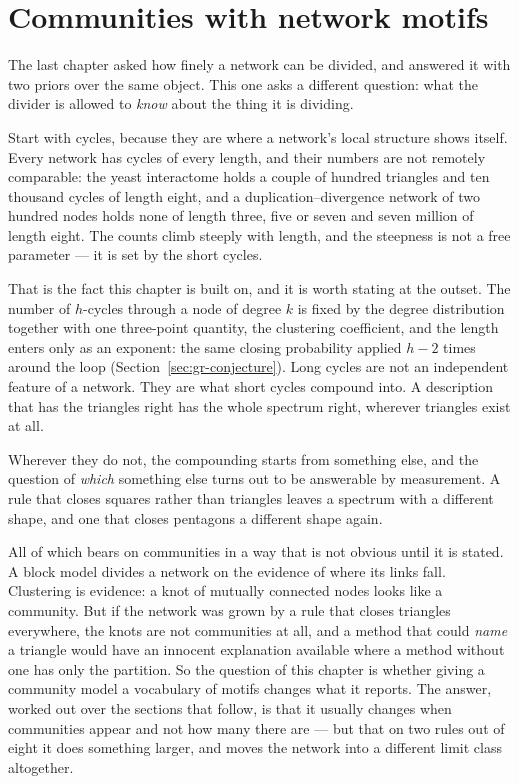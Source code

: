 \chapter{Communities with network motifs}
\label{ch:motifs}

The last chapter asked how finely a network can be divided, and answered it with
two priors over the same object. This one asks a different question: what the
divider is allowed to \emph{know} about the thing it is dividing.

Start with cycles, because they are where a network's local structure shows
itself. Every network has cycles of every length, and their numbers are not
remotely comparable: the yeast interactome holds a couple of hundred triangles
and ten thousand cycles of length eight, and a duplication--divergence network of
two hundred nodes holds none of length three, five or seven and seven million of
length eight. The counts climb steeply with length, and the steepness is not a
free parameter --- it is set by the short cycles.

That is the fact this chapter is built on, and it is worth stating at the outset.
The number of $h$-cycles through a node of degree $k$ is fixed by the degree
distribution together with one three-point quantity, the clustering coefficient,
and the length enters only as an exponent: the same closing probability applied
$h-2$ times around the loop (Section~\ref{sec:gr-conjecture}). Long cycles are not an
independent feature of a network. They are what short cycles compound into. A
description that has the triangles right has the whole spectrum right, wherever
triangles exist at all.

Wherever they do not, the compounding starts from something else, and the
question of \emph{which} something else turns out to be answerable by
measurement. A rule that closes squares rather than triangles leaves a spectrum
with a different shape, and one that closes pentagons a different shape again.

All of which bears on communities in a way that is not obvious until it is
stated. A block model divides a network on the evidence of where its links fall.
Clustering is evidence: a knot of mutually connected nodes looks like a
community. But if the network was grown by a rule that closes triangles
everywhere, the knots are not communities at all, and a method that could
\emph{name} a triangle would have an innocent explanation available where a
method without one has only the partition. So the question of this chapter is
whether giving a community model a vocabulary of motifs changes what it reports.
The answer, worked out over the sections that follow, is that it usually changes
when communities appear and not how many there are --- but that on two rules out
of eight it does something larger, and moves the network into a different limit
class altogether.

